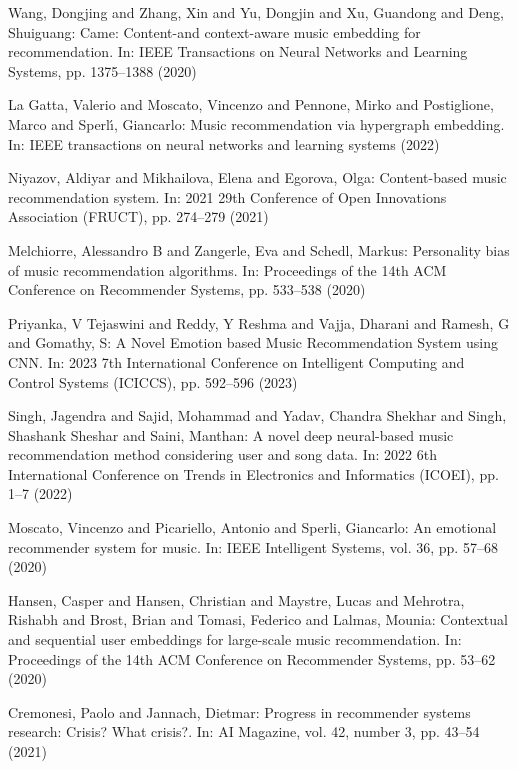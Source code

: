 \documentclass[runningheads,a4paper]{llncs}
\begin{document}
\begin{thebibliography}{4}

 Wang, Dongjing and Zhang, Xin and Yu, Dongjin and Xu, Guandong and Deng, Shuiguang: 
Came: Content-and context-aware music embedding for recommendation. In: IEEE Transactions on Neural Networks and Learning Systems,
pp. 1375--1388 (2020)

 La Gatta, Valerio and Moscato, Vincenzo and Pennone, Mirko and Postiglione, Marco and Sperl{\'\i}, Giancarlo:
Music recommendation via hypergraph embedding. In: IEEE transactions on neural networks and learning systems (2022)

 Niyazov, Aldiyar and Mikhailova, Elena and Egorova, Olga:
Content-based music recommendation system. In: 2021 29th Conference of Open Innovations Association (FRUCT),
pp. 274--279 (2021)

 Melchiorre, Alessandro B and Zangerle, Eva and Schedl, Markus:
Personality bias of music recommendation algorithms. In: Proceedings of the 14th ACM Conference on Recommender Systems, 
pp. 533--538 (2020)

 Priyanka, V Tejaswini and Reddy, Y Reshma and Vajja, Dharani and Ramesh, G and Gomathy, S:
A Novel Emotion based Music Recommendation System using CNN. In: 2023 7th International Conference on Intelligent Computing and Control Systems (ICICCS),
pp. 592--596 (2023)

 Singh, Jagendra and Sajid, Mohammad and Yadav, Chandra Shekhar and Singh, Shashank Sheshar and Saini, Manthan:
A novel deep neural-based music recommendation method considering user and song data. In: 2022 6th International Conference on Trends in Electronics and Informatics (ICOEI),
pp. 1--7 (2022)

 Moscato, Vincenzo and Picariello, Antonio and Sperli, Giancarlo:
An emotional recommender system for music. In: IEEE Intelligent Systems, vol. 36, pp. 57--68 (2020)

 Hansen, Casper and Hansen, Christian and Maystre, Lucas and Mehrotra, Rishabh and Brost, Brian and Tomasi, Federico and Lalmas, Mounia:
Contextual and sequential user embeddings for large-scale music recommendation. In: 
Proceedings of the 14th ACM Conference on Recommender Systems, pp. 53--62 (2020)

 Cremonesi, Paolo and Jannach, Dietmar: Progress in recommender systems research: Crisis? What crisis?. In:
AI Magazine, vol. 42, number 3, pp. 43--54 (2021)


\end{thebibliography}
\end{document}
